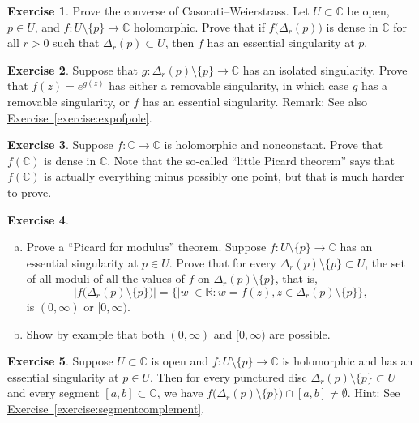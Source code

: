 \documentclass[12pt,openany]{book}
\newcommand{\sabs}[1]{\lvert {#1} \rvert}
\newcommand{\abs}[1]{\left\lvert {#1} \right\rvert}
\newcommand{\C}{{\mathbb{C}}}
\newcommand{\R}{{\mathbb{R}}}
\newcommand{\myquote}[1]{``#1''}
\theoremstyle{plain}
\theoremstyle{remark}
\theoremstyle{definition}
\newenvironment{exbox}{%
    \def\FrameCommand{\vrule width 1pt \relax\hspace{10pt}}%
    \MakeFramed{\advance\hsize-\width\FrameRestore}%
}{%
    \endMakeFramed
}
\newenvironment{exparts}{%
    \leavevmode\begin{enumerate}[a),noitemsep,topsep=0pt,parsep=0pt,partopsep=0pt]
}{%
    \end{enumerate}
}
\theoremstyle{exercise}
\newtheorem{exercise}{Exercise}[section]
\theoremstyle{example}
\newcommand{\exerciseref}[1]{\hyperref[#1]{Exercise~\ref*{#1}}}
\begin{document}
\begin{exbox}
\begin{exercise}
Prove the converse of Casorati--Weierstrass.
Let $U \subset \C$ be open, $p \in U$, and
$f \colon U \setminus \{ p \} \to \C$
holomorphic.
Prove that if $f\bigl(\Delta_r(p)\bigr)$ is dense in $\C$
for all $r > 0$ such that $\Delta_r(p) \subset U$,
then $f$ has an essential singularity at $p$.
\end{exercise}

\begin{exercise}%
\label{exercise:singofexp}
Suppose that $g \colon \Delta_r(p) \setminus \{ p \} \to \C$
has an isolated singularity.  Prove that $f(z) = e^{g(z)}$
has either a removable singularity, in which case $g$
has a removable singularity, or $f$ has an essential singularity.
Remark: See also \exerciseref{exercise:expofpole}.
\end{exercise}

\begin{exercise}
Suppose $f \colon \C \to \C$ is holomorphic and nonconstant.
Prove that $f(\C)$ is dense in $\C$.
Note that the so-called \myquote{little Picard theorem} says that $f(\C)$
is actually everything minus possibly one point,
but that is much harder to prove.
\end{exercise}

\begin{exercise}
\pagebreak[2]
\begin{exparts}
\item
Prove a \myquote{Picard for modulus} theorem.
Suppose $f \colon U \setminus \{ p \} \to \C$ has an essential singularity
at $p \in U$.
Prove that
for every 
$\Delta_r(p) \setminus \{ p \} \subset U$, the set
of all moduli of all the values of $f$ on $\Delta_r(p) \setminus \{ p \}$,
that is,
\begin{equation*}
\abs{f\bigl(\Delta_r(p) \setminus \{ p \} \bigr)}
=
\bigl\{ \sabs{w} \in \R : w = f(z), z \in \Delta_r(p) \setminus \{ p \}
\bigr\},
\end{equation*}
is $(0,\infty)$ or $[0,\infty)$.
\item
Show by example that both $(0,\infty)$ and $[0,\infty)$ are possible.
\end{exparts}
\end{exercise}

\begin{exercise}
Suppose $U \subset \C$ is open and $f \colon U \setminus \{ p \} \to \C$ is
holomorphic and has
an essential singularity at $p \in U$.  Then for every punctured disc
$\Delta_r(p) \setminus \{ p \} \subset U$ and every segment $[a,b] \subset
\C$, we have
$f\bigl(\Delta_r(p) \setminus \{ p \} \bigr) \cap [a,b] \not= \emptyset$.
Hint: See 
\exerciseref{exercise:segmentcomplement}.
\end{exercise}
\end{exbox}
\end{document}
